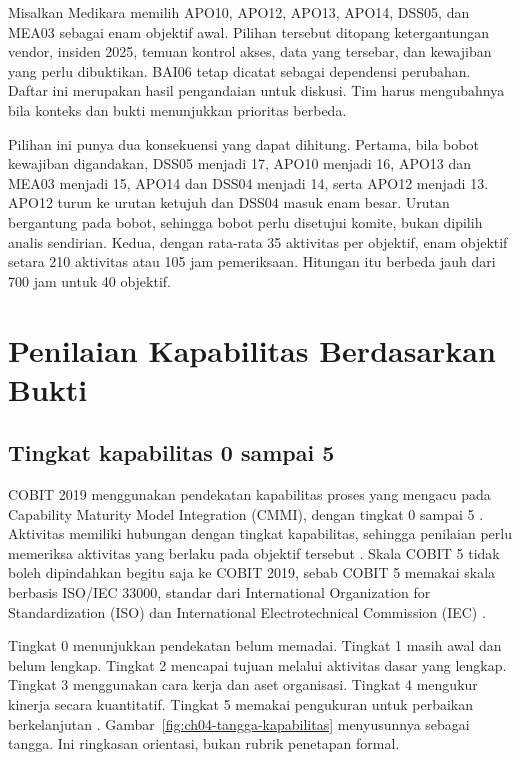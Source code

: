 \begin{kasus}[title={Kasus Medikara Health: Memilih Enam Objektif Awal}]
Misalkan Medikara memilih APO10, APO12, APO13, APO14, DSS05, dan MEA03 sebagai enam objektif awal. Pilihan tersebut ditopang
ketergantungan vendor, insiden 2025, temuan kontrol akses, data yang tersebar, dan kewajiban yang perlu dibuktikan. BAI06 tetap dicatat
sebagai dependensi perubahan. Daftar ini merupakan hasil pengandaian untuk diskusi. Tim harus mengubahnya bila konteks dan bukti
menunjukkan prioritas berbeda.

Pilihan ini punya dua konsekuensi yang dapat dihitung. Pertama, bila bobot kewajiban digandakan, DSS05 menjadi 17, APO10 menjadi 16, APO13
dan MEA03 menjadi 15, APO14 dan DSS04 menjadi 14, serta APO12 menjadi 13. APO12 turun ke urutan ketujuh dan DSS04 masuk enam besar.
Urutan bergantung pada bobot, sehingga bobot perlu disetujui komite, bukan dipilih analis sendirian. Kedua, dengan rata-rata 35 aktivitas
per objektif, enam objektif setara 210 aktivitas atau 105 jam pemeriksaan. Hitungan itu berbeda jauh dari 700 jam untuk 40 objektif.
\end{kasus}

\section{Penilaian Kapabilitas Berdasarkan Bukti}

\subsection*{Tingkat kapabilitas 0 sampai 5}

COBIT 2019 menggunakan pendekatan kapabilitas proses yang mengacu pada Capability Maturity Model Integration (CMMI), dengan tingkat 0 sampai
5 \cite{c04-perbandingan}. Aktivitas memiliki hubungan dengan tingkat kapabilitas, sehingga penilaian perlu memeriksa aktivitas yang berlaku
pada objektif tersebut \cite{c04-baru}. Skala COBIT 5 tidak boleh dipindahkan begitu saja ke COBIT 2019, sebab COBIT 5 memakai skala berbasis
ISO/IEC 33000, standar dari International Organization for Standardization (ISO) dan International Electrotechnical Commission (IEC)
\cite{c04-perbandingan}.

Tingkat 0 menunjukkan pendekatan belum memadai. Tingkat 1 masih awal dan belum lengkap. Tingkat 2 mencapai tujuan melalui aktivitas dasar yang
lengkap. Tingkat 3 menggunakan cara kerja dan aset organisasi. Tingkat 4 mengukur kinerja secara kuantitatif. Tingkat 5 memakai pengukuran untuk
perbaikan berkelanjutan \cite{c04-kapabilitas}. Gambar~\ref{fig:ch04-tangga-kapabilitas} menyusunnya sebagai tangga. Ini ringkasan orientasi,
bukan rubrik penetapan formal.


